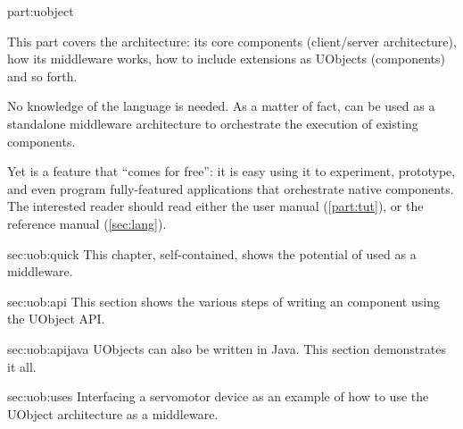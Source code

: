 
\begin{partDescription}{part:uobject}
  {
    This part covers the \urbi architecture: its core components
    (client/server architecture), how its middleware works, how to
    include extensions as UObjects (\Cxx components) and so forth.

    No knowledge of the \us language is needed.  As a matter of fact,
    \urbi can be used as a standalone middleware architecture to
    orchestrate the execution of existing components.

    Yet \us is a feature that ``comes for free'': it is easy using it
    to experiment, prototype, and even program fully-featured
    applications that orchestrate native components.  The interested
    reader should read either the \us user manual
    (\autoref{part:tut}), or the reference manual
    (\autoref{sec:lang}).
  }
\item[sec:uob:quick] This chapter, self-contained, shows the potential
  of \urbi used as a middleware.
\item[sec:uob:api] This section shows the various steps of writing an
  \urbi \Cxx component using the UObject API.
\item[sec:uob:apijava] UObjects can also be written in Java.  This section
  demonstrates it all.
\item[sec:uob:uses] Interfacing a servomotor device as an example of how to
  use the UObject architecture as a middleware.
\end{partDescription}

